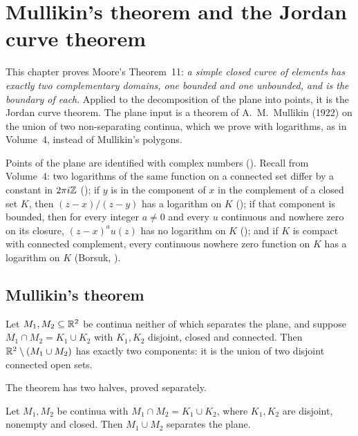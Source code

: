 \chapter{Mullikin's theorem and the Jordan curve theorem}\label{ch:jordan}

This chapter proves Moore's Theorem~11: \emph{a simple closed curve of elements has exactly two
complementary domains, one bounded and one unbounded, and is the boundary of each}. Applied to the
decomposition of the plane into points, it is the Jordan curve theorem. The plane input is a theorem
of A.~M.~Mullikin (1922) on the union of two non-separating continua, which we prove with
logarithms, as in Volume~4, instead of Mullikin's polygons.

Points of the plane are identified with complex numbers (). Recall from Volume~4:
two logarithms of the same function on a connected set differ by a constant in $2\pi i\mathbb{Z}$
(); if $y$ is in the component of $x$ in the complement of a closed set $K$, then
$(z-x)/(z-y)$ has a logarithm on $K$ (); if that component is bounded, then for
every integer $a\ne0$ and every $u$ continuous and nowhere zero on its closure, $(z-x)^au(z)$ has no
logarithm on $K$ (); and if $K$ is compact with connected complement, every
continuous nowhere zero function on $K$ has a logarithm on $K$ (Borsuk, ).

\section{Mullikin's theorem}

\begin{theorem}\label{thm:mullikin}
Let $M_1,M_2\subseteq\mathbb{R}^2$ be continua neither of which separates the plane, and suppose
$M_1\cap M_2=K_1\cup K_2$ with $K_1,K_2$ disjoint, closed and connected. Then $\mathbb{R}^2\setminus(M_1\cup
M_2)$ has exactly two components: it is the union of two disjoint connected open sets.
\end{theorem}

The theorem has two halves, proved separately.

\begin{proposition}\label{prop:mullikin-two}
Let $M_1,M_2$ be continua with $M_1\cap M_2=K_1\cup K_2$, where $K_1,K_2$ are disjoint, nonempty and
closed. Then $M_1\cup M_2$ separates the plane.
\end{proposition}

